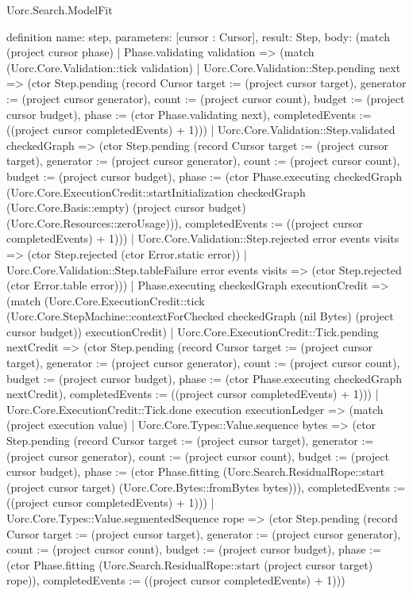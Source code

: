 \begin{lexlean}{Uorc.Search.ModelFit}
\begin{semanticmodule}
definition{
  name: step,
  parameters: [cursor : Cursor],
  result: Step,
  body: (match (project cursor phase)
    | Phase.validating validation => (match (Uorc.Core.Validation::tick validation)
      | Uorc.Core.Validation::Step.pending next => (ctor Step.pending (record Cursor {target := (project cursor target), generator := (project cursor generator), count := (project cursor count), budget := (project cursor budget), phase := (ctor Phase.validating next), completedEvents := ((project cursor completedEvents) + 1)}))
      | Uorc.Core.Validation::Step.validated checkedGraph => (ctor Step.pending (record Cursor {target := (project cursor target), generator := (project cursor generator), count := (project cursor count), budget := (project cursor budget), phase := (ctor Phase.executing checkedGraph (Uorc.Core.ExecutionCredit::startInitialization checkedGraph (Uorc.Core.Basis::empty) (project cursor budget) (Uorc.Core.Resources::zeroUsage))), completedEvents := ((project cursor completedEvents) + 1)}))
      | Uorc.Core.Validation::Step.rejected error events visits => (ctor Step.rejected (ctor Error.static error))
      | Uorc.Core.Validation::Step.tableFailure error events visits => (ctor Step.rejected (ctor Error.table error)))
    | Phase.executing checkedGraph executionCredit => (match (Uorc.Core.ExecutionCredit::tick (Uorc.Core.StepMachine::contextForChecked checkedGraph (nil Bytes) (project cursor budget)) executionCredit)
      | Uorc.Core.ExecutionCredit::Tick.pending nextCredit => (ctor Step.pending (record Cursor {target := (project cursor target), generator := (project cursor generator), count := (project cursor count), budget := (project cursor budget), phase := (ctor Phase.executing checkedGraph nextCredit), completedEvents := ((project cursor completedEvents) + 1)}))
      | Uorc.Core.ExecutionCredit::Tick.done execution executionLedger => (match (project execution value)
        | Uorc.Core.Types::Value.sequence bytes => (ctor Step.pending (record Cursor {target := (project cursor target), generator := (project cursor generator), count := (project cursor count), budget := (project cursor budget), phase := (ctor Phase.fitting (Uorc.Search.ResidualRope::start (project cursor target) (Uorc.Core.Bytes::fromBytes bytes))), completedEvents := ((project cursor completedEvents) + 1)}))
        | Uorc.Core.Types::Value.segmentedSequence rope => (ctor Step.pending (record Cursor {target := (project cursor target), generator := (project cursor generator), count := (project cursor count), budget := (project cursor budget), phase := (ctor Phase.fitting (Uorc.Search.ResidualRope::start (project cursor target) rope)), completedEvents := ((project cursor completedEvents) + 1)}))
}
\end{semanticmodule}
\end{lexlean}
